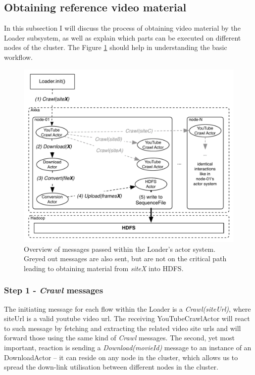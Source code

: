 \newpage
\subsection{Obtaining reference video material}
\label{sec:obtaining-reference-material}
In this subsection I will discuss the process of obtaining video material by the Loader subsystem, as well as explain which parts can be executed on different nodes of the cluster. The Figure \ref{fig:high-level-loader} should help in understanding the basic workflow.

\begin{figure}[ch!]
  \centering
  \includegraphics[scale=0.9]{./diagrams/loader-high-level.pdf}
  \caption{Overview of messages passed within the Loader's actor system. Greyed out messages are also sent, but are not on the critical path leading to obtaining material from \textit{siteX} into HDFS.}
  \label{fig:high-level-loader}
\end{figure}

\subsubsection{Step 1 - \textit{Crawl} messages}
The initiating message for each flow within the Loader is a \textit{Crawl(siteUrl)}, where siteUrl is a valid youtube video url.
The receiving YouTubeCrawlActor will react to such message by fetching and extracting the related video site urls and will forward those using the same kind of \textit{Crawl} messages. The second, yet most important, reaction is sending a \textit{Download(movieId)} message to an instance of an DownloadActor -- it  can reside on any node in the cluster, which allows us to spread the down-link utilisation between different nodes in the cluster.

